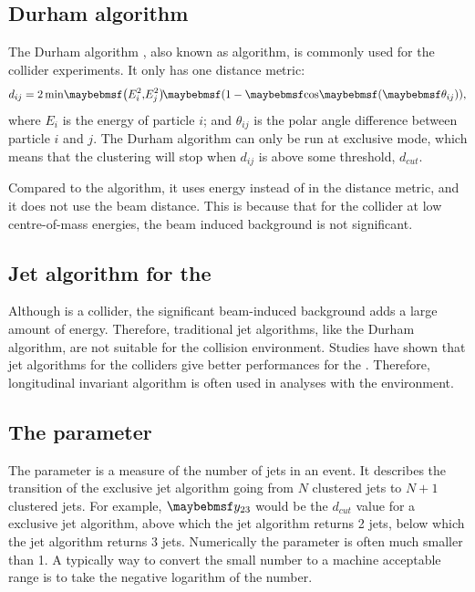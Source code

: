 \subsection{Durham algorithm}
\label{sec:pandoraJetDurham}
The Durham algorithm \cite{Catani:1991hj}, also known as \ee \kt algorithm, is commonly used for the \ee collider experiments. It only has one distance metric:
\begin{equation}
d_{ij} = 2\min\!\parenths{E_i^2,\!E_j^2}\!\parenths{1 - \cosOf{\theta_{ij}}},
\end{equation}
where $E_i$ is the energy of particle $i$; and $\theta_{ij}$ is the polar angle difference between particle $i$ and $j$. The Durham algorithm can only be run at exclusive mode, which means that the clustering will stop when $d_{ij}$ is above some threshold, $d_{cut}$.

Compared to the \kt algorithm, it uses energy instead of \pT in the distance metric, and it does not use the beam distance. This is because that for the \ee collider at low centre-of-mass energies, the beam induced background is not significant.

\subsection{Jet algorithm for the \CLIC}

Although \CLIC is a \ee collider, the significant beam-induced background adds a large amount of energy. Therefore, traditional \ee jet algorithms, like the Durham algorithm, are not suitable for the \CLIC collision environment. Studies have shown that jet algorithms for the \pp colliders give better performances for the \CLIC \cite{Linssen:2012hp,LCD-Note-2010-006}. Therefore, longitudinal invariant \kt algorithm is often used in analyses with the \CLIC environment.





\subsection{The \y{} parameter}
\label{sec:pandoraYparameter}
The \y{} parameter is a measure of the number of jets in an event.  It describes the transition of  the exclusive jet algorithm going from $N$ clustered jets to $N\!+\!1$ clustered jets. For example, $\y{23}$ would be the $d_{cut}$ value for a exclusive jet algorithm, above which the jet algorithm returns 2 jets, below which the jet algorithm returns 3 jets. Numerically the \y{} parameter is often much smaller than 1. A typically way to convert the small number to a machine acceptable range is to take the negative logarithm of the number.

